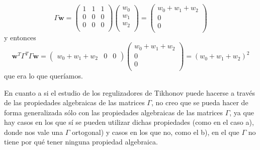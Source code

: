 \documentclass[12pt]{article}
\theoremstyle{definition}
\begin{document}
\begin{pregunta}
\begin{enumerate}
\[\]
\[ \Gamma\mathbf{w} = \left( \begin{array}{ccc}
		1 & 1 & 1 \\
		0 & 0 & 0\\
		0 & 0 & 0 \\ \end{array} \right)
		\left( \begin{array}{c}
		w_0 \\
		w_1 \\
		w_2 \\  \end{array} \right) = \left( \begin{array}{c}
		w_0 + w_1 + w_2 \\
		0 \\
		0 \\  \end{array} \right)
\]
y entonces
\[ \mathbf{w}^T\Gamma^T\Gamma\mathbf{w} = \left( \begin{array}{ccc}
		w_0+w_1+w_2 & 0 & 0 \end{array} \right)
		 \left( \begin{array}{c}
		w_0 + w_1 + w_2 \\
		0 \\
		0 \\  \end{array} \right) = (w_0+w_1+w_2)^2
\]
que era lo que queríamos.
\end{enumerate}

En cuanto a si el estudio de los regulizadores de Tikhonov puede hacerse a través de las propiedades algebraicas de las matrices $\Gamma$, no creo que se pueda hacer de forma generalizada sólo con las propiedades algebraicas de las matrices $\Gamma$, ya que hay casos en los que sí se pueden utilizar dichas propiedades (como en el caso a), donde nos vale una $\Gamma$ ortogonal) y casos en los que no, como el b), en el que $\Gamma$ no tiene por qué tener ninguna propiedad algebraica.
\end{pregunta}
\end{document}
